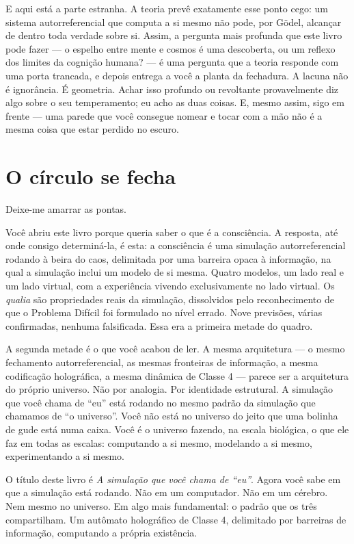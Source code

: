 \documentclass[11pt, twoside, openright]{book}
\begin{document}
E aqui está a parte estranha. A teoria prevê exatamente esse ponto cego: um sistema autorreferencial que computa a si mesmo não pode, por Gödel, alcançar de dentro toda verdade sobre si. Assim, a pergunta mais profunda que este livro pode fazer --- o espelho entre mente e cosmos é uma descoberta, ou um reflexo dos limites da cognição humana? --- é uma pergunta que a teoria responde com uma porta trancada, e depois entrega a você a planta da fechadura. A lacuna não é ignorância. É geometria. Achar isso profundo ou revoltante provavelmente diz algo sobre o seu temperamento; eu acho as duas coisas. E, mesmo assim, sigo em frente --- uma parede que você consegue nomear e tocar com a mão não é a mesma coisa que estar perdido no escuro.

\section*{O círculo se fecha}

Deixe-me amarrar as pontas.

Você abriu este livro porque queria saber o que é a consciência. A resposta, até onde consigo determiná-la, é esta: a consciência é uma simulação autorreferencial rodando à beira do caos, delimitada por uma barreira opaca à informação, na qual a simulação inclui um modelo de si mesma. Quatro modelos, um lado real e um lado virtual, com a experiência vivendo exclusivamente no lado virtual. Os \textit{qualia} são propriedades reais da simulação, dissolvidos pelo reconhecimento de que o Problema Difícil foi formulado no nível errado. Nove previsões, várias confirmadas, nenhuma falsificada. Essa era a primeira metade do quadro.

A segunda metade é o que você acabou de ler. A mesma arquitetura --- o mesmo fechamento autorreferencial, as mesmas fronteiras de informação, a mesma codificação holográfica, a mesma dinâmica de Classe 4 --- parece ser a arquitetura do próprio universo. Não por analogia. Por identidade estrutural. A simulação que você chama de ``eu'' está rodando no mesmo padrão da simulação que chamamos de ``o universo''. Você não está no universo do jeito que uma bolinha de gude está numa caixa. Você é o universo fazendo, na escala biológica, o que ele faz em todas as escalas: computando a si mesmo, modelando a si mesmo, experimentando a si mesmo.

O título deste livro é \textit{A simulação que você chama de ``eu''}. Agora você sabe em que a simulação está rodando. Não em um computador. Não em um cérebro. Nem mesmo no universo. Em algo mais fundamental: o padrão que os três compartilham. Um autômato holográfico de Classe 4, delimitado por barreiras de informação, computando a própria existência.
\end{document}
